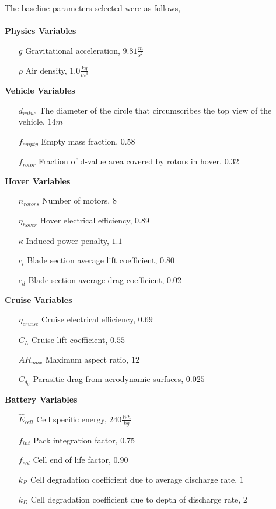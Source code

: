 \documentclass[12pt, letter]{article}
\begin{document}
The baseline parameters selected were as follows,\\\\
\textbf{Physics Variables}
\begin{itemize}
	\item[$g$] Gravitational acceleration, $9.81 \frac{m}{s^2}$
	\item[$\rho$] Air density, $1.0 \frac{kg}{m^3}$
	\item[]
\end{itemize}
\textbf{Vehicle Variables}
\begin{itemize}
	\item[$d_{value}$] The diameter of the circle that circumscribes the top view of the vehicle, $14 m$ 
	\item[$f_{empty}$] Empty mass fraction, $0.58$
	\item[$f_{rotor}$] Fraction of d-value area covered by rotors in hover, $0.32$
	\item[]
\end{itemize}
\textbf{Hover Variables}
\begin{itemize}
	\item[$n_{rotors}$] Number of motors, $8$
	\item[$\eta_{hover}$] Hover electrical efficiency, $0.89$
	\item[$\kappa$] Induced power penalty, $1.1$
	\item[$c_l$] Blade section average lift coefficient, $0.80$
	\item[$c_d$] Blade section average drag coefficient, $0.02$
	\item[]
\end{itemize}
\textbf{Cruise Variables}
\begin{itemize}
	\item[$\eta_{cruise}$] Cruise electrical efficiency, $0.69$
	\item[$C_L$] Cruise lift coefficient, $0.55$
	\item[$AR_{max}$] Maximum aspect ratio, $12$
	\item[$C_{d_0}$] Parasitic drag from aerodynamic surfaces, $0.025$
	\item[]
\end{itemize}
\textbf{Battery Variables}
\begin{itemize}
	\item[$\hat{E}_{cell}$] Cell specific energy, $240 \frac{Wh}{kg}$
	\item[$f_{int}$] Pack integration factor, $0.75$
	\item[$f_{eol}$] Cell end of life factor, $0.90$
	\item[$k_R$] Cell degradation coefficient due to average discharge rate, $1$
	\item[$k_D$] Cell degradation coefficient due to depth of discharge rate, $2$
	\item[]
\end{itemize}
\end{document}
